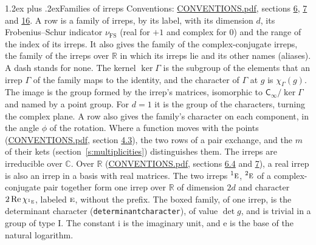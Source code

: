 \documentclass[10pt,a4paper]{article}
\makeatletter
\renewcommand\section{\@startsection{section}{1}{\z@}{-3ex plus -1ex minus -.2ex}%
  {1.2ex plus .2ex}{\normalfont\large\sffamily\bfseries\color{parttitle}}}
\numberwithin{equation}{section}
\newcommand{\grp}[1]{\mathsf{#1}}
\newcommand{\irr}[1]{\text{\normalfont\scshape #1}}
\newcommand{\conjpair}[1]{{}^{#1}}
\newcommand{\iunit}{\mathrm{i}}
\newcommand{\expe}{\mathrm{e}}
\newcommand{\irchar}[1]{\chi_{#1}}
\newcommand{\fsind}{\nu_{\mathrm{FS}}}
\makeatother
\begin{document}
\section{Families of irreps}\label{s:families}
Conventions: \href{../../CONVENTIONS.pdf}{CONVENTIONS.pdf}, sections \href{../../CONVENTIONS.pdf\#conv.6}{6}, \href{../../CONVENTIONS.pdf\#conv.7}{7} and \href{../../CONVENTIONS.pdf\#conv.16}{16}.
\leavevmode\label{n:index.dimension}\label{n:index.frobenius}\label{n:index.family}\label{n:head.family.irreps}\label{n:head.index.family}A row is a family of irreps, by its label, with its dimension $d$, its Frobenius--Schur indicator $\fsind$ (real for $+1$ and complex for $0$) and the range of the index of its irreps. \label{n:head.conjugate}\label{n:head.over.real}\label{n:head.aliases}It also gives the family of the complex-conjugate irreps, the family of the irreps over $\mathbb{R}$ in which its irreps lie and its other names (aliases). A dash stands for none. \label{n:irrep.Gamma}\label{n:head.kernel}\label{n:function.character}The kernel $\ker\Gamma$ is the subgroup of the elements that an irrep $\Gamma$ of the family maps to the identity, and the character of $\Gamma$ at $g$ is $\irchar{\Gamma}(g)$. \label{n:head.image}The image is the group formed by the irrep's matrices, isomorphic to $\grp{C_{\infty}}/\ker\Gamma$ and named by a point group. For $d = 1$ it is the group of the characters, turning the complex plane. A row also gives the family's character on each component, in the angle $\phi$ of the rotation. Where a function moves with the points (\href{../../CONVENTIONS.pdf}{CONVENTIONS.pdf}, section \href{../../CONVENTIONS.pdf\#conv.4.3}{4.3}), the two rows of a pair exchange, and the $m$ of their kets (section~\ref{s:multiplicities}) distinguishes them. The irreps are irreducible over $\mathbb{C}$. Over $\mathbb{R}$ (\href{../../CONVENTIONS.pdf}{CONVENTIONS.pdf}, sections \href{../../CONVENTIONS.pdf\#conv.6.4}{6.4} and \href{../../CONVENTIONS.pdf\#conv.7}{7}), a real irrep is also an irrep in a basis with real matrices. The two irreps $\conjpair{1}\irr{e}$, $\conjpair{2}\irr{e}$ of a complex-conjugate pair together form one irrep over $\mathbb{R}$ of dimension $2d$ and character $2\operatorname{Re}\irchar{\conjpair{1}\irr{e}}$, labeled $\irr{e}$, without the prefix. \label{n:mark.determinant}The boxed family, of one irrep, is the determinant character (\texttt{determinantcharacter}), of value $\det g$, and is trivial in a group of type I.
The constant $\iunit$ is the imaginary unit, and $\expe$ is the base of the natural logarithm.
\end{document}
